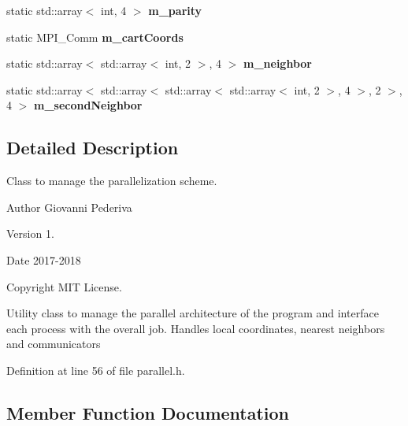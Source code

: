 \begin{DoxyCompactItemize}
\item 
static std\+::array$<$ int, 4 $>$ {\bfseries m\+\_\+parity}\hypertarget{classParallel_a01f36b6b5f23733bb9e5ef537787f6fa}{}\label{classParallel_a01f36b6b5f23733bb9e5ef537787f6fa}

\item 
static M\+P\+I\+\_\+\+Comm {\bfseries m\+\_\+cart\+Coords}\hypertarget{classParallel_a522bd2939de7adbb0413bb14352a4172}{}\label{classParallel_a522bd2939de7adbb0413bb14352a4172}

\item 
static std\+::array$<$ std\+::array$<$ int, 2 $>$, 4 $>$ {\bfseries m\+\_\+neighbor}\hypertarget{classParallel_ac3c55e557814bf2ceff5f0561dfcc2d4}{}\label{classParallel_ac3c55e557814bf2ceff5f0561dfcc2d4}

\item 
static std\+::array$<$ std\+::array$<$ std\+::array$<$ std\+::array$<$ int, 2 $>$, 4 $>$, 2 $>$, 4 $>$ {\bfseries m\+\_\+second\+Neighbor}\hypertarget{classParallel_af69b636eab0ecd9d4a5066b38bfdc979}{}\label{classParallel_af69b636eab0ecd9d4a5066b38bfdc979}

\end{DoxyCompactItemize}


\subsection{Detailed Description}
Class to manage the parallelization scheme. 

\begin{DoxyAuthor}{Author}
Giovanni Pederiva 
\end{DoxyAuthor}
\begin{DoxyVersion}{Version}
1. 
\end{DoxyVersion}
\begin{DoxyDate}{Date}
2017-\/2018 
\end{DoxyDate}
\begin{DoxyCopyright}{Copyright}
M\+IT License.
\end{DoxyCopyright}
Utility class to manage the parallel architecture of the program and interface each process with the overall job. Handles local coordinates, nearest neighbors and communicators 

Definition at line 56 of file parallel.\+h.



\subsection{Member Function Documentation}
